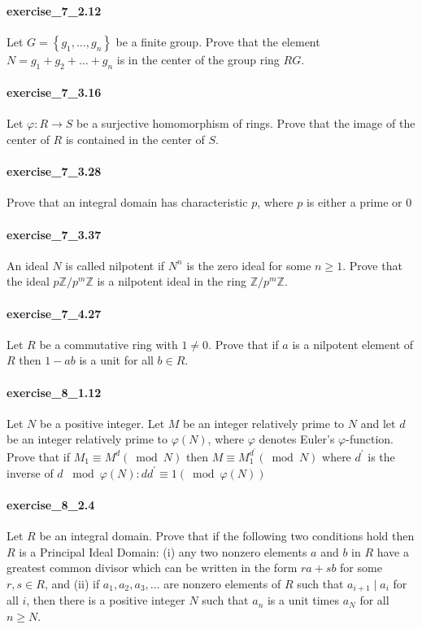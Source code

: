 \documentclass{article}
\begin{document}
\paragraph{exercise\_7\_2.12} Let $G=\left\{g_{1}, \ldots, g_{n}\right\}$ be a finite group. Prove that the element $N=g_{1}+g_{2}+\ldots+g_{n}$ is in the center of the group ring $R G$.

\paragraph{exercise\_7\_3.16} Let $\varphi: R \rightarrow S$ be a surjective homomorphism of rings. Prove that the image of the center of $R$ is contained in the center of $S$.

\paragraph{exercise\_7\_3.28} Prove that an integral domain has characteristic $p$, where $p$ is either a prime or 0

\paragraph{exercise\_7\_3.37} An ideal $N$ is called nilpotent if $N^{n}$ is the zero ideal for some $n \geq 1$. Prove that the ideal $p \mathbb{Z} / p^{m} \mathbb{Z}$ is a nilpotent ideal in the ring $\mathbb{Z} / p^{m} \mathbb{Z}$.

\paragraph{exercise\_7\_4.27} Let $R$ be a commutative ring with $1 \neq 0$. Prove that if $a$ is a nilpotent element of $R$ then $1-a b$ is a unit for all $b \in R$.

\paragraph{exercise\_8\_1.12} Let $N$ be a positive integer. Let $M$ be an integer relatively prime to $N$ and let $d$ be an integer relatively prime to $\varphi(N)$, where $\varphi$ denotes Euler's $\varphi$-function. Prove that if $M_{1} \equiv M^{d}(\bmod N)$ then $M \equiv M_{1}^{d^{\prime}}(\bmod N)$ where $d^{\prime}$ is the inverse of $d$ $\bmod \varphi(N): d d^{\prime} \equiv 1(\bmod \varphi(N))$

\paragraph{exercise\_8\_2.4} Let $R$ be an integral domain. Prove that if the following two conditions hold then $R$ is a Principal Ideal Domain: (i) any two nonzero elements $a$ and $b$ in $R$ have a greatest common divisor which can be written in the form $r a+s b$ for some $r, s \in R$, and (ii) if $a_{1}, a_{2}, a_{3}, \ldots$ are nonzero elements of $R$ such that $a_{i+1} \mid a_{i}$ for all $i$, then there is a positive integer $N$ such that $a_{n}$ is a unit times $a_{N}$ for all $n \geq N$.
\end{document}
